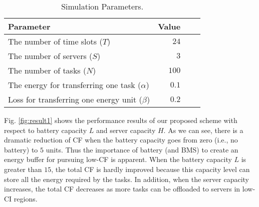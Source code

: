 \documentclass[conference, 10pt, ﬁnal, letterpaper, twocolumn]{IEEEtran}
\begin{document}
\begin{table}[h]
    \caption{\label{tab:parameters}Simulation Parameters.}
    \footnotesize
    \begin{center}
        \begin{threeparttable}[b]
            \begin{tabular}{*{2}{lr}}
                \toprule
                \midrule
                {\bf Parameter} & {\bf Value}\\
                \midrule
                 The number of time slots ($T$) & $24$ \\
                 The number of servers ($S$) & $3$\\
                 The number of tasks ($N$) & $100$\\
                 The energy for transferring one task ($\alpha$) & $0.1$\\
                 Loss for transferring one energy unit ($\beta$) & $0.2$\\
                \bottomrule
            \end{tabular}
        \end{threeparttable}
    \end{center}
\end{table}



Fig. \ref{fig:result1} shows the performance results of our proposed scheme with respect to battery capacity $L$ and server capacity $H$. As we can see, there is a dramatic reduction of CF when the battery capacity goes from zero (i.e., no battery) to $5$ units. Thus the importance of battery (and BMS) to create an energy buffer for pursuing low-CF is apparent. When the battery capacity $L$ is greater than $15$, the total CF is hardly improved because this capacity level can store all the energy required by the tasks. In addition, when the server capacity increases, the total CF decreases as more tasks can be offloaded to servers in low-CI regions.
\end{document}
